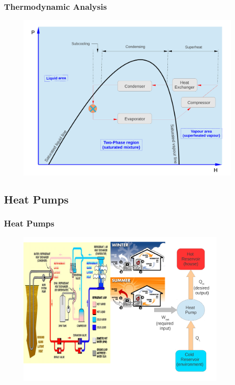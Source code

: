 \documentclass[10pt,compress]{beamer}
\begin{document}
\begin{frame}
 \frametitle{Thermodynamic Analysis} 
   \begin{figure}%
     \includegraphics[width=.8\columnwidth]{./Pics/Overview_Refrig19}
   \end{figure}
\end{frame}

\subsection{Heat Pumps}

\begin{frame}
 \frametitle{Heat Pumps}
    \begin{figure}%
     \begin{center}
      \includegraphics[width=12.cm,height=7.8cm]{./Pics/Overview_Refrig35}
     \end{center}
    \end{figure}
\end{frame}
\end{document}
